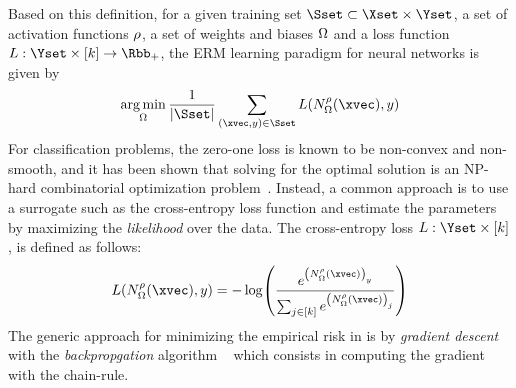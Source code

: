 \noindent
Based on this definition, for a given training set $\Sset \subset \Xset \times \Yset$, a set of activation functions $\rho$, a set of weights and biases $\Omega$ and a loss function $L: \Yset \times [k] \rightarrow \Rbb_+$, the ERM learning paradigm for neural networks is given by
\begin{equation} \label{equation:ch2-erm_neural_network}
  \argmin_{\weights} \frac{1}{|\Sset|} \sum_{(\xvec, y) \in \Sset} L(N^\act_\weights(\xvec), y) 
\end{equation}
For classification problems, the zero-one loss is known to be non-convex and non-smooth, and it has been shown that solving for the optimal solution is an NP-hard combinatorial optimization problem~\cite{feldman2012agnostic,bendavid2003difficulty}.
Instead, a common approach is to use a surrogate such as the cross-entropy loss function and estimate the parameters by maximizing the \emph{likelihood} over the data.
The cross-entropy loss $L:\Yset \times [k]$, is defined as follows:
\begin{equation}
  L(N^\rho_\Omega(\xvec), y) = -\log
    \left(
      \frac
        {e^{\left(N^\rho_\Omega(\xvec)\right)_y}}
	{\sum_{j\in[k]} e^{\left(N^\rho_\Omega(\xvec)\right)_j}}
    \right)
\end{equation}
The generic approach for minimizing the empirical risk in  is by \emph{gradient descent} with the \emph{backpropgation} algorithm ~\cite{rumelhart1986learning} which consists in computing the gradient with the chain-rule.






